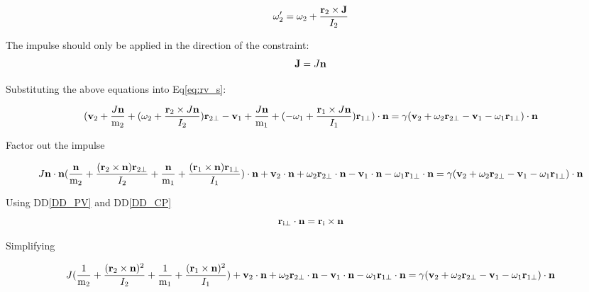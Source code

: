 \documentclass[12pt]{article}
\begin{document}
\begin{equation*}
\omega'_\text{2} = \omega_\text{2} + \frac{\textbf r_\text{2} \times \textbf
J}{I_\text{2}}
  \end{equation*}


\noindent
The impulse should only be applied in the direction of the constraint: 
\begin{equation}
\textbf J = J\textbf n \label{eq:imp2}
\end{equation}

\noindent
Substituting the above equations into Eq\ref{eq:rv_s}:

\begin{equation*}
(\textbf v_\text{2} + \frac{ J\textbf n}{ \textnormal m_\text{2}} + 
( \omega_\text{2} + \frac{ \textbf r_\text{2} \times J\textbf n}{I_\text{2}})\textbf r_\text{2$\perp$} -
\textbf v_\text{1} + \frac{J\textbf n}{ \textnormal m_\text{1}} +  
( - \omega_\text{1} + \frac{ \textbf r_\text{1} \times J\textbf n}{I_\text{1}})\textbf r_\text{1$\perp$}) \cdot \textbf n =\gamma(\textbf
v_\text{2} + \omega_\text{2}\textbf r_\text{2$\perp$} - \textbf v_\text{1} -
\omega_\text{1}\textbf r_\text{1$\perp$}) \cdot \textbf n
\end{equation*}

\noindent
Factor out the impulse 

\begin{equation*}
J\textbf n \cdot \textbf n(\frac{\textbf n}{ \textnormal m_\text{2}} + \frac{(\textbf r_\text{2} \times
\textbf n) \textbf r_\text{2$\perp$} }{I_\text{2}} + \frac{\textbf n}{
\textnormal m_\text{1}} + \frac{(\textbf r_\text{1} \times \textbf n) \textbf
r_\text{1$\perp$} }{I_\text{1}} ) \cdot \textbf n +
\textbf v_\text{2}\cdot \textbf n + \omega_\text{2}\textbf r_\text{2$\perp$}
\cdot \textbf n -
\textbf v_\text{1} \cdot \textbf n - \omega_\text{1}\textbf r_\text{1$\perp$}
\cdot \textbf n= \gamma(\textbf v_\text{2} + \omega_\text{2}\textbf
r_\text{2$\perp$} - \textbf v_\text{1} - \omega_\text{1}\textbf
r_\text{1$\perp$}) \cdot \textbf n
\end{equation*}

\noindent
Using DD\ref{DD_PV} and DD\ref{DD_CP}
\begin{equation*}
\textbf r_\text{i$\perp$} \cdot \textbf n = \textbf r_\text{i} \times \textbf n
\end{equation*}

\noindent
Simplifying

\begin{equation*}
J(\frac{1}{ \textnormal m_\text{2}} + \frac{(\textbf r_\text{2} \times \textbf
n)^{2} }{I_\text{2}} + \frac{1}{ \textnormal m_\text{1}} + \frac{(\textbf
r_\text{1} \times \textbf n) ^{2}}{I_\text{1}} )+
\textbf v_\text{2}\cdot \textbf n + \omega_\text{2}\textbf r_\text{2$\perp$}
\cdot \textbf n -
\textbf v_\text{1} \cdot \textbf n - \omega_\text{1}\textbf r_\text{1$\perp$}
\cdot \textbf n= \gamma(\textbf v_\text{2} + \omega_\text{2}\textbf
r_\text{2$\perp$} - \textbf v_\text{1} - \omega_\text{1}\textbf
r_\text{1$\perp$}) \cdot \textbf n
\end{equation*}
\end{document}
